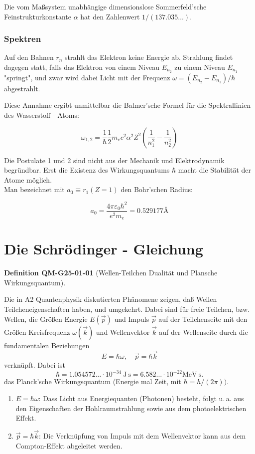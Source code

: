 \documentclass[10pt, letterpaper]{article}
\newcommand{\CustomHeading}[3]{%
  \par\medskip\noindent%
  \textbf{#1 #2} \textnormal{(#3)}.\enskip%
}
\newenvironment{DEF}[2]{\begin{unitbox}\CustomHeading{Definition}{#1}{#2}}{\end{unitbox}}
\begin{document}
Die vom Maßsystem unabhängige dimensionslose Sommerfeld'sche Feinstrukturkonstante $\alpha$ hat den Zahlenwert $1 /(137.035 \ldots)$.

\subsubsection*{Spektren}
Auf den Bahnen $r_{n}$ strahlt das Elektron keine Energie ab. Strahlung findet dagegen statt, falls das Elektron von einem Niveau $E_{n_{2}}$ zu einem Niveau $E_{n_{1}}$ "springt", und zwar wird dabei Licht mit der Frequenz $\omega=\left(E_{n_{2}}-E_{n_{1}}\right) / \hbar$ abgestrahlt.

Diese Annahme ergibt unmittelbar die Balmer'sche Formel für die Spektrallinien des Wasserstoff - Atoms:

$$
\omega_{1,2}=\frac{1}{\hbar} \frac{1}{2} m_{e} c^{2} \alpha^{2} Z^{2}\left(\frac{1}{n_{1}^{2}}-\frac{1}{n_{2}^{2}}\right)
$$

Die Postulate 1 und 2 sind nicht aus der Mechanik und Elektrodynamik begründbar. Erst die Existenz des Wirkungsquantums $\hbar$ macht die Stabilität der Atome möglich.\\
Man bezeichnet mit $a_{0} \equiv r_{1}(Z=1)$ den Bohr'schen Radius:

$$
a_{0}=\frac{4 \pi \varepsilon_{0} \hbar^{2}}{e^{2} m_{e}}=0.529177 \text{\AA}
$$










\pagebreak



\section{Die Schrödinger - Gleichung}



\begin{DEF}{QM-G25-01-01}{Wellen-Teilchen Dualität und Plansche Wirkungsquantum}
Die in A2 Quantenphysik diskutierten Phänomene zeigen, daß Wellen Teilcheneigenschaften haben, und umgekehrt. Dabei sind für freie Teilchen, bzw. Wellen, die Größen Energie $E(\vec{p})$ und Impuls $\vec{p}$ auf der Teilchenseite mit den Größen Kreisfrequenz $\omega(\vec{k})$ und Wellenvektor $\vec{k}$ auf der Wellenseite durch die fundamentalen Beziehungen
$$
E=\hbar \omega, \quad \vec{p}=\hbar \vec{k}
$$
verknüpft. Dabei ist
$$
\hbar=1.054572 \ldots \cdot 10^{-34} \mathrm{~J} \mathrm{~s}=6.582 \ldots \cdot 10^{-22} \mathrm{MeV} \mathrm{~s} .
$$
das Planck'sche Wirkungsquantum (Energie mal Zeit, mit $\hbar=h /(2 \pi))$.
\begin{enumerate}
  \item $E = \hbar \omega$: Dass Licht aus Energiequanten (Photonen) besteht, folgt u.\,a. aus den Eigenschaften der Hohlraumstrahlung sowie aus dem photoelektrischen Effekt.
  \item $\vec{p} = \hbar \vec{k}$: Die Verknüpfung von Impuls mit dem Wellenvektor kann aus dem Compton-Effekt abgeleitet werden.
\end{enumerate}
\end{DEF}
\end{document}
